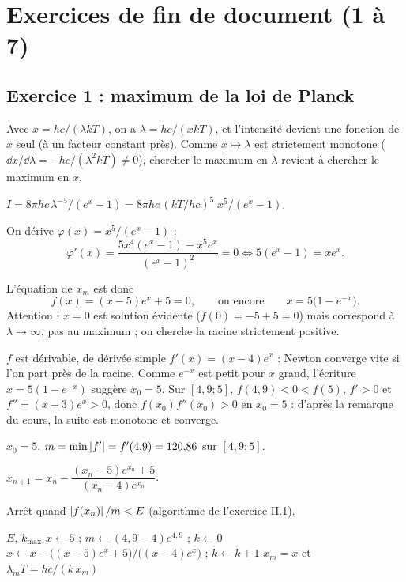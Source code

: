 \chapter{Exercices de fin de document (1 à 7)}

\section{Exercice 1 : maximum de la loi de Planck}

\Pourquoi Avec $x = hc/(\lambda kT)$, on a $\lambda = hc/(xkT)$, et l'intensité
devient une fonction de $x$ seul (à un facteur constant près). Comme
$x \mapsto \lambda$ est strictement monotone ($\dd x/\dd\lambda =
-hc/(\lambda^2kT) \ne 0$), chercher le maximum en $\lambda$ revient à chercher
le maximum en $x$.

 $I = 8\pi hc\,\lambda^{-5}/(e^{x} - 1) = 8\pi hc\,(kT/hc)^5\;x^5/(e^{x} - 1)$.

 On dérive $\varphi(x) = x^5/(e^{x} - 1)$ :
\[
  \varphi'(x) = \frac{5x^4(e^{x} - 1) - x^5e^{x}}{(e^{x} - 1)^2} = 0
  \iff 5(e^{x} - 1) = xe^{x} .
\]

 L'équation de $x_m$ est donc
\[
  f(x) = (x - 5)e^{x} + 5 = 0, \qquad\text{ou encore}\qquad x = 5\bigl(1 - e^{-x}\bigr) .
\]
Attention : $x = 0$ est solution évidente ($f(0) = -5 + 5 = 0$) mais
correspond à $\lambda \to \infty$, pas au maximum ; on cherche la racine
strictement positive.

\Pourquoi $f$ est dérivable, de dérivée simple $f'(x) = (x - 4)e^{x}$ : Newton
converge vite si l'on part près de la racine. Comme $e^{-x}$ est petit pour $x$
grand, l'écriture $x = 5(1 - e^{-x})$ suggère $x_0 = 5$. Sur $[4{,}9 ; 5]$,
$f(4{,}9) < 0 < f(5)$, $f' > 0$ et $f'' = (x - 3)e^{x} > 0$, donc
$f(x_0)f''(x_0) > 0$ en $x_0 = 5$ : d'après la remarque du cours, la suite est
monotone et converge.

\Etapes
{} $x_0 = 5$, $m = \min\left|f'\right| = f'(4{,}9) = 120{,}86$ sur $[4{,}9 ; 5]$.

 $x_{n+1} = x_n - \dfrac{(x_n - 5)e^{x_n} + 5}{(x_n - 4)e^{x_n}}$.

 Arrêt quand $\left|f(x_n)\right|/m < E$ (algorithme de l'exercice II.1).

\begin{algo}
  \Require $E$, $k_{\max}$
  \State $x \leftarrow 5$ ; $m \leftarrow (4{,}9 - 4)e^{4{,}9}$ ; $k \leftarrow 0$
  \Repeat
    \State $x \leftarrow x - \bigl((x-5)e^{x} + 5\bigr)/\bigl((x-4)e^{x}\bigr)$ ; $k \leftarrow k + 1$
  \Print $x_m = x$ et $\lambda_mT = hc/(k\,x_m)$
\end{algo}

